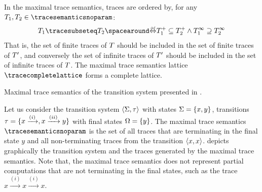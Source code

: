 In the maximal trace semantics, traces are ordered by, for any $\defsetoftraces_1, \defsetoftraces_2 \in \tracesemanticsnoparam$:
\begin{align*}
  \defsetoftraces_1 \tracesubseteq \defsetoftraces_2 \DefifF \retrievefinitetraces{\defsetoftraces_1} \subseteq \retrievefinitetraces{\defsetoftraces_2} \land \retrieveinfinitetraces{\defsetoftraces_1} \supseteq \retrieveinfinitetraces{\defsetoftraces_2}
\end{align*}
That is, the set of finite traces of $T$ should be included in the set of finite traces of $T'$, and conversely the set of infinite traces of $T'$ should be included in the set of infinite traces of $T$. The maximal trace semantics lattice $\tracecompletelattice$ forms a complete lattice.

\begin{marginfigure}
  \centering
{}
\caption{Maximal trace semantics of the transition system presented in .}
\end{marginfigure}

\begin{example}
  Let us consider the transition system $\langle \Sigma, \tau \rangle$ with states $\Sigma = \{x, y\}$, transitions $\tau = \{x \xrightarrow{(i)}, x \xrightarrow{(ii)} y\}$ with final states $\Omega = \{y\}$. The maximal trace semantics $\tracesemanticsnoparam$ is the set of all traces that are terminating in the final state $y$ and all non-terminating traces from the transition $\langle x, x \rangle$.
   depicts graphically the transition system and the traces generated by the maximal trace semantics.
  Note that, the maximal trace semantics does not represent partial computations that are not terminating in the final states, such as the trace $x \xrightarrow{(i)} x \xrightarrow{(i)} x$.
\end{example}

